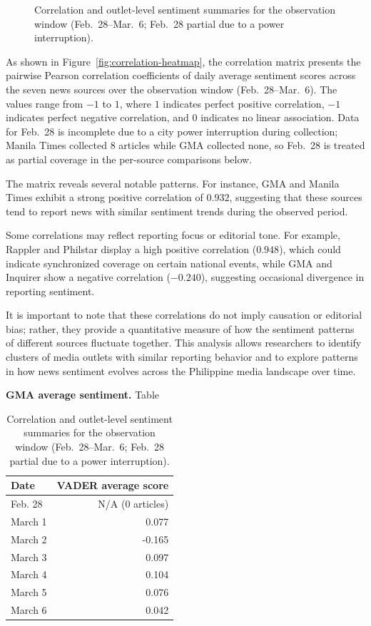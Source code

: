 \documentclass[sigconf, nonacm]{acmart}
\begin{document}
\begin{table}[h]
{\begin{figure}[h]
  \caption{Correlation and outlet-level sentiment summaries for the observation window (Feb.~28--Mar.~6; Feb.~28 partial due to a power interruption).}
  \label{fig:correlation}
\end{figure}

As shown in Figure~\ref{fig:correlation-heatmap}, the correlation matrix presents the pairwise Pearson correlation coefficients of daily average sentiment scores across the seven news sources over the observation window (Feb.~28--Mar.~6). The values range from $-1$ to $1$, where $1$ indicates perfect positive correlation, $-1$ indicates perfect negative correlation, and $0$ indicates no linear association. Data for Feb.~28 is incomplete due to a city power interruption during collection; Manila Times collected 8 articles while GMA collected none, so Feb.~28 is treated as partial coverage in the per-source comparisons below.

The matrix reveals several notable patterns. For instance, GMA and Manila Times exhibit a strong positive correlation of $0.932$, suggesting that these sources tend to report news with similar sentiment trends during the observed period.

Some correlations may reflect reporting focus or editorial tone. For example, Rappler and Philstar display a high positive correlation ($0.948$), which could indicate synchronized coverage on certain national events, while GMA and Inquirer show a negative correlation ($-0.240$), suggesting occasional divergence in reporting sentiment.

It is important to note that these correlations do not imply causation or editorial bias; rather, they provide a quantitative measure of how the sentiment patterns of different sources fluctuate together. This analysis allows researchers to identify clusters of media outlets with similar reporting behavior and to explore patterns in how news sentiment evolves across the Philippine media landscape over time.

\textbf{GMA average sentiment.} Table}
  \centering
  \small
  \begin{tabular}{lr}
    \toprule
    Date & VADER average score \\
    \midrule
    Feb. 28 & N/A (0 articles) \\
    March 1 & 0.077 \\
    March 2 & -0.165 \\
    March 3 & 0.097 \\
    March 4 & 0.104 \\
    March 5 & 0.076 \\
    March 6 & 0.042 \\
    \bottomrule
  \end{tabular}
\end{table}
\end{document}
